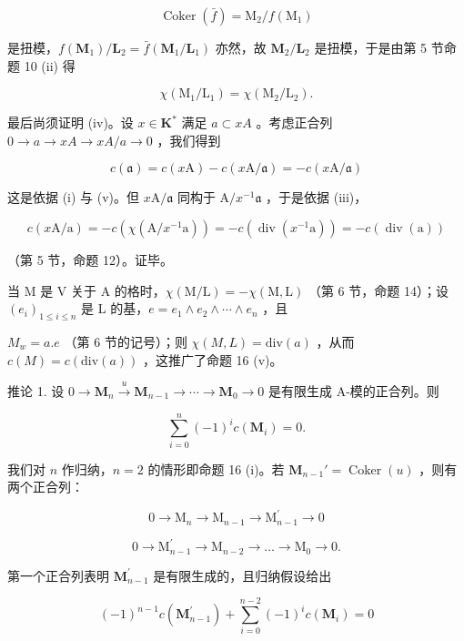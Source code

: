 \[
\operatorname{Coker} (\bar {f}) = \mathrm{M} _ {2} / f (\mathrm{M} _ {1})
\]

是扭模，\(f(\mathbf{M}_1) / \mathbf{L}_2 = \bar{f} (\mathbf{M}_1 / \mathbf{L}_1)\) 亦然，故 \(\mathbf{M}_2 / \mathbf{L}_2\) 是扭模，于是由第 5 节命题 10 (ii) 得

\[
\chi (\mathrm{M} _ {1} / \mathrm{L} _ {1}) = \chi (\mathrm{M} _ {2} / \mathrm{L} _ {2}).
\]

最后尚须证明 (iv)。设 \(x \in \mathbf{K}^*\) 满足 \(a \subset xA\) 。考虑正合列 \(0 \to a \to xA \to xA / a \to 0\) ，我们得到

\[
c (\mathfrak {a}) = c (x \mathrm{A}) - c (x \mathrm{A} / \mathfrak {a}) = - c (x \mathrm{A} / \mathfrak {a})
\]

这是依据 (i) 与 (v)。但 \(x\mathrm{A} / \mathfrak{a}\) 同构于 \(\mathrm{A} / x^{-1}\mathfrak{a}\) ，于是依据 (iii)，

\[
c (x \mathrm{A} / \mathrm{a}) = - c (\chi (\mathrm{A} / x ^ {- 1} \mathrm{a})) = - c (\operatorname{div} (x ^ {- 1} \mathrm{a})) = - c (\operatorname{div} (\mathrm{a}))
\]

（第 5 节，命题 12）。证毕。

当 M 是 V 关于 A 的格时，\(\chi(\mathrm{M}/\mathrm{L}) = -\chi(\mathrm{M}, \mathrm{L})\) （第 6 节，命题 14）；设 \((e_{i})_{1 \leqslant i \leqslant n}\) 是 L 的基，\(e = e_{1} \wedge e_{2} \wedge \cdots \wedge e_{n}\) ，且

\(M_{w} = a.e\) （第 6 节的记号）；则 \(\chi(M, L) = \text{div}(a)\) ，从而 \(c(M) = c(\text{div}(a))\) ，这推广了命题 16 (v)。

推论 1. 设 \(0 \to \mathbf{M}_n \xrightarrow{u} \mathbf{M}_{n-1} \to \cdots \to \mathbf{M}_0 \to 0\) 是有限生成 A-模的正合列。则

\[
\sum_ {i = 0} ^ {n} (- 1) ^ {i} c (\mathbf {M} _ {i}) = 0.
\]

我们对 \(n\) 作归纳，\(n = 2\) 的情形即命题 16 (i)。若 \(\mathbf{M}_{n-1}' = \operatorname{Coker}(u)\) ，则有两个正合列：

\[
0 \rightarrow \mathrm{M} _ {n} \rightarrow \mathrm{M} _ {n - 1} \rightarrow \mathrm{M} _ {n - 1} ^ {\prime} \rightarrow 0
\]

\[
0 \rightarrow \mathrm{M} _ {n - 1} ^ {\prime} \rightarrow \mathrm{M} _ {n - 2} \rightarrow \dots \rightarrow \mathrm{M} _ {0} \rightarrow 0.
\]

第一个正合列表明 \(\mathbf{M}_{n - 1}^{\prime}\) 是有限生成的，且归纳假设给出

\[
(- 1) ^ {n - 1} c (\mathbf {M} _ {n - 1} ^ {\prime}) + \sum_ {i = 0} ^ {n - 2} (- 1) ^ {i} c (\mathbf {M} _ {i}) = 0
\]

